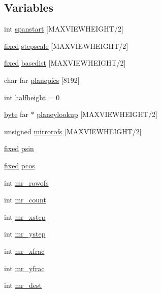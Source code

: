 \subsection*{Variables}
\begin{DoxyCompactItemize}
\item 
int \hyperlink{WOLFHACK_8C_a4c8e4e6767346701059a389a561eab09}{spanstart} \mbox{[}MAXVIEWHEIGHT/2\mbox{]}
\item 
\hyperlink{WL__DEF_8H_aaf54715c9b83afe8794059fcf5fd5e7e}{fixed} \hyperlink{WOLFHACK_8C_aee3e1fe06a4bbdaec4efa03285418bd5}{stepscale} \mbox{[}MAXVIEWHEIGHT/2\mbox{]}
\item 
\hyperlink{WL__DEF_8H_aaf54715c9b83afe8794059fcf5fd5e7e}{fixed} \hyperlink{WOLFHACK_8C_a438b5b45fb7e4e8f4038de91c545a1de}{basedist} \mbox{[}MAXVIEWHEIGHT/2\mbox{]}
\item 
char far \hyperlink{WOLFHACK_8C_ace6436dbd4081ecd213b7715ec40c0d8}{planepics} \mbox{[}8192\mbox{]}
\item 
int \hyperlink{WOLFHACK_8C_a786e4a310fcb61bcadec564b0d88287c}{halfheight} = 0
\item 
\hyperlink{ID__HEAD_8H_a0c8186d9b9b7880309c27230bbb5e69d}{byte} far $\ast$ \hyperlink{WOLFHACK_8C_ad771d208226d5fd2ca351064a640ac2f}{planeylookup} \mbox{[}MAXVIEWHEIGHT/2\mbox{]}
\item 
unsigned \hyperlink{WOLFHACK_8C_a8d66d6359b69e9e7c5c7490437e38a5b}{mirrorofs} \mbox{[}MAXVIEWHEIGHT/2\mbox{]}
\item 
\hyperlink{WL__DEF_8H_aaf54715c9b83afe8794059fcf5fd5e7e}{fixed} \hyperlink{WOLFHACK_8C_a3f4072476e9a69dd0c2718e588fe1b4c}{psin}
\item 
\hyperlink{WL__DEF_8H_aaf54715c9b83afe8794059fcf5fd5e7e}{fixed} \hyperlink{WOLFHACK_8C_a7b1009cc68ef81a4eaa5e08eea2ccb74}{pcos}
\item 
int \hyperlink{WOLFHACK_8C_a74f476a5a310e2a6a1d59a877c4707b8}{mr\_\-rowofs}
\item 
int \hyperlink{WOLFHACK_8C_a879f6513ad9724ee834b04562c9d47f9}{mr\_\-count}
\item 
int \hyperlink{WOLFHACK_8C_a5e1dcb6057300dde0c075bf1dbf424bf}{mr\_\-xstep}
\item 
int \hyperlink{WOLFHACK_8C_abfe86fc5a57e574112c2264f95ab22c0}{mr\_\-ystep}
\item 
int \hyperlink{WOLFHACK_8C_a39d192d4ed93f79d568c9ab323b4b400}{mr\_\-xfrac}
\item 
int \hyperlink{WOLFHACK_8C_a099e4c6b679dc697b2e7758f15d42fa5}{mr\_\-yfrac}
\item 
int \hyperlink{WOLFHACK_8C_a6c335719beda6e730be77c1a0d1ae3ce}{mr\_\-dest}
\end{DoxyCompactItemize}


